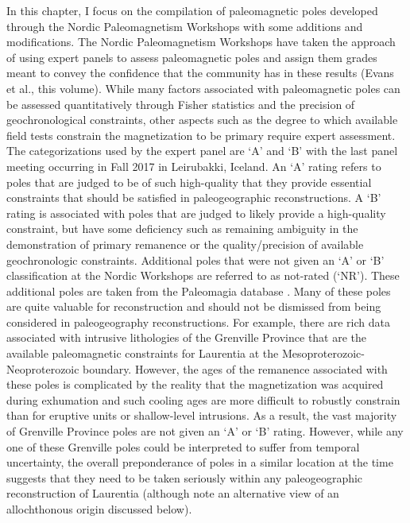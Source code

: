 \documentclass[11pt,letterpaper]{article}
\begin{document}
In this chapter, I focus on the compilation of paleomagnetic poles developed through the Nordic Paleomagnetism Workshops with some additions and modifications. The Nordic Paleomagnetism Workshops have taken the approach of using expert panels to assess paleomagnetic poles and assign them grades meant to convey the confidence that the community has in these results (Evans et al., this volume). While many factors associated with paleomagnetic poles can be assessed quantitatively through Fisher statistics and the precision of geochronological constraints, other aspects such as the degree to which available field tests constrain the magnetization to be primary require expert assessment. The categorizations used by the expert panel are `A' and `B' with the last panel meeting occurring in Fall 2017 in Leirubakki, Iceland. An `A' rating refers to poles that are judged to be of such high-quality that they provide essential constraints that should be satisfied in paleogeographic reconstructions. A `B' rating is associated with poles that are judged to likely provide a high-quality constraint, but have some deficiency such as remaining ambiguity in the demonstration of primary remanence or the quality/precision of available geochronologic constraints. Additional poles that were not given an `A' or `B' classification at the Nordic Workshops are referred to as not-rated (`NR'). These additional poles are taken from the Paleomagia database \citep{Veikkolainen2013a}. Many of these poles are quite valuable for reconstruction and should not be dismissed from being considered in paleogeography reconstructions. For example, there are rich data associated with intrusive lithologies of the Grenville Province that are the available paleomagnetic constraints for Laurentia at the Mesoproterozoic-Neoproterozoic boundary. However, the ages of the remanence associated with these poles is complicated by the reality that the magnetization was acquired during exhumation and such cooling ages are more difficult to robustly constrain than for eruptive units or shallow-level intrusions. As a result, the vast majority of Grenville Province poles are not given an `A' or `B' rating. However, while any one of these Grenville poles could be interpreted to suffer from temporal uncertainty, the overall preponderance of poles in a similar location at the time suggests that they need to be taken seriously within any paleogeographic reconstruction of Laurentia (although note an alternative view of an allochthonous origin discussed below). 
\end{document}
